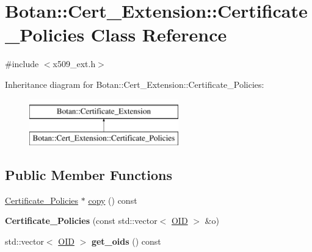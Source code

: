 \hypertarget{classBotan_1_1Cert__Extension_1_1Certificate__Policies}{\section{Botan\-:\-:Cert\-\_\-\-Extension\-:\-:Certificate\-\_\-\-Policies Class Reference}
\label{classBotan_1_1Cert__Extension_1_1Certificate__Policies}
}


{\ttfamily \#include $<$x509\-\_\-ext.\-h$>$}

Inheritance diagram for Botan\-:\-:Cert\-\_\-\-Extension\-:\-:Certificate\-\_\-\-Policies\-:\begin{figure}[H]
\begin{center}
\leavevmode
\includegraphics[height=2.000000cm]{classBotan_1_1Cert__Extension_1_1Certificate__Policies}
\end{center}
\end{figure}
\subsection*{Public Member Functions}
\begin{DoxyCompactItemize}
\item 
\hyperlink{classBotan_1_1Cert__Extension_1_1Certificate__Policies}{Certificate\-\_\-\-Policies} $\ast$ \hyperlink{classBotan_1_1Cert__Extension_1_1Certificate__Policies_aa4431d8d130c3f7718aa2654f324ac2f}{copy} () const 
\item 
\hypertarget{classBotan_1_1Cert__Extension_1_1Certificate__Policies_acecef1b920217c2f0ccab7b957791092}{{\bfseries Certificate\-\_\-\-Policies} (const std\-::vector$<$ \hyperlink{classBotan_1_1OID}{O\-I\-D} $>$ \&o)}\label{classBotan_1_1Cert__Extension_1_1Certificate__Policies_acecef1b920217c2f0ccab7b957791092}

\item 
\hypertarget{classBotan_1_1Cert__Extension_1_1Certificate__Policies_add0de3b69fe7f4f5cbda0480dfe4877e}{std\-::vector$<$ \hyperlink{classBotan_1_1OID}{O\-I\-D} $>$ {\bfseries get\-\_\-oids} () const }\label{classBotan_1_1Cert__Extension_1_1Certificate__Policies_add0de3b69fe7f4f5cbda0480dfe4877e}

\end{DoxyCompactItemize}


